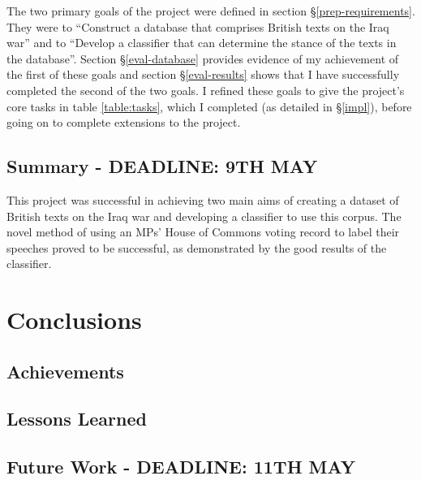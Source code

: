 \documentclass[12pt,a4paper,twoside,openright]{report}
\begin{document}
The two primary goals of the project were defined in section \S\ref{prep-requirements}. They were to ``Construct a database that comprises British texts on the Iraq war'' and to ``Develop a classifier that can determine the stance of the texts in the database''. Section \S\ref{eval-database} provides evidence of my achievement of the first of these goals and section \S\ref{eval-results} shows that I have successfully completed the second of the two goals. I refined these goals to give the project's core tasks in table \ref{table:tasks}, which I completed (as detailed in \S\ref{impl}), before going on to complete extensions to the project.

\section{Summary - DEADLINE: 9TH MAY}

This project was successful in achieving two main aims of creating a dataset of British texts on the Iraq war and developing a classifier to use this corpus. The novel method of using an MPs' House of Commons voting record to label their speeches proved to be successful, as demonstrated by the good results of the classifier.

\chapter{Conclusions} \label{conc}

\section{Achievements}

\section{Lessons Learned}

\section{Future Work - DEADLINE: 11TH MAY}

\end{document}

